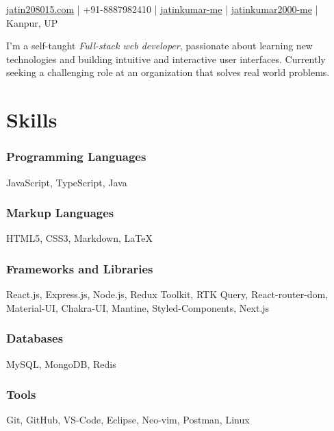 \documentclass[a4paper]{article}
\author{Jatin Kumar}
\begin{document}
\begin{center}
	\makeatletter
	\centering {\huge \@author}
	\makeatother
    \vspace{6pt}

    \href{mailto:jatin208015\@gmail.com}{{\faAt} jatin208015\@gmail.com} | 
    {\faPhone } +91-8887982410 | 
    \href{https://github.com/jatinkumar-me}{{\faGithub} jatinkumar-me} |
    \href{https://www.linkedin.com/in/jatinkumar-2000-me/}{{\faLinkedin} {jatinkumar2000-me}} |
    {\faMapMarker} Kanpur, UP
\end{center}

\begin{flushleft}
    I’m a self-taught \textit{Full-stack web developer}, passionate about learning new technologies and building intuitive and interactive user interfaces. Currently seeking a challenging role at an organization that solves real world problems.
\end{flushleft}

\section{Skills}
\subsubsection*{Programming Languages}
    JavaScript, TypeScript, Java
    \vspace{-10pt}
\subsubsection*{Markup Languages}
    HTML5, CSS3, Markdown, \LaTeX
    \vspace{-10pt}
\subsubsection*{Frameworks and Libraries}
React.js, Express.js, Node.js, Redux Toolkit, RTK Query, React-router-dom, Material-UI, Chakra-UI, Mantine, Styled-Components, Next.js
    \vspace{-10pt}
\subsubsection*{Databases}
MySQL, MongoDB, Redis
    \vspace{-10pt}
\subsubsection*{Tools}
Git, GitHub, VS-Code, Eclipse, Neo-vim, Postman, Linux
\end{document}
